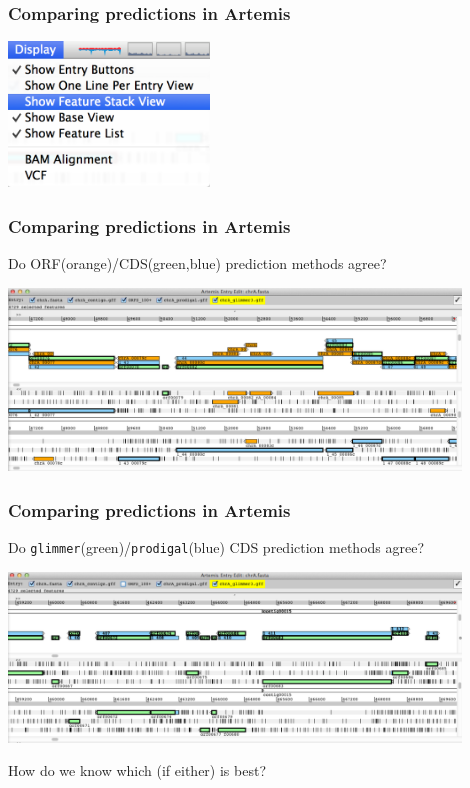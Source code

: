\begin{frame}
  \frametitle{Comparing predictions in Artemis}
  \begin{center}
    \includegraphics[width=0.4\textwidth]{images/artemis_cdspred2}     
  \end{center}
\end{frame}

\begin{frame}
  \frametitle{Comparing predictions in Artemis}
  Do ORF(orange)/CDS(green,blue) prediction methods agree?
  \begin{center}
    \includegraphics[width=0.9\textwidth]{images/artemis_cdspred3}     
  \end{center}
\end{frame}

\begin{frame}
  \frametitle{Comparing predictions in Artemis}
  Do \texttt{glimmer}(green)/\texttt{prodigal}(blue) CDS prediction methods agree?
  \begin{center}
    \includegraphics[width=0.9\textwidth]{images/artemis_cdspred4}     
  \end{center}
  How do we know which (if either) is best?
\end{frame}
